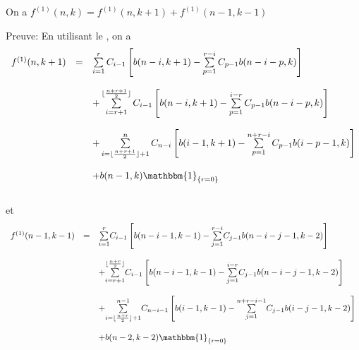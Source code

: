 \begin{proposition}\label{p11}
	On a $f^{(1)}(n, k) = f^{(1)}(n, k+1) + f^{(1)}(n-1, k-1)$
\end{proposition}
Preuve: En utilisant le , on a
$$
	\begin{array}{l l l}
		f^{(1)}(n, k+1) & =        & \sum\limits_{i=1}^{r}C_{i-1}\left[ b(n-i, k+1) - \sum\limits_{p=1}^{r-i}C_{p-1}b(n-i-p, k) \right]                                      \\ &\text{ }&\\
		                & \text{ } & + \sum\limits_{i=r+1}^{\lfloor \frac{n+r+1}{2} \rfloor}C_{i-1}\left[ b(n-i, k+1) - \sum\limits_{p=1}^{i-r}C_{p-1}b(n-i-p, k) \right]    \\ &\text{ }&\\
		                & \text{ } & + \sum\limits_{i=\lfloor \frac{n+r+1}{2} \rfloor +1}^{n}C_{n-i}\left[ b(i-1, k+1) - \sum\limits_{p=1}^{n+r-i}C_{p-1}b(i-p-1, k) \right] \\ &\text{ }&\\
		                & \text{ } & +  b(n-1, k)\mathbbm{1}_{\{r=0\}}                                                                                                       \\
	\end{array}
$$
\vspace{5pt}\\
et
\vspace{5pt}\\
$$
	\begin{array} {l l l}
		f^{(1)}(n-1,k-1) & =       & \underset{i=1}{\overset{r}{\sum}}C_{i-1}\left[b(n-i-1,k-1)-\underset{j=1}{\overset{r-i}{\sum}}C_{j-1}b(n-i-j-1,k-2)\right]                                   \\ &\text{ }&\\ &\text{}&+\underset{i=r+1}{\overset{\lfloor \frac{n+r}{2}\rfloor}{\sum}}C_{i-1}\left[b(n-i-1,k-1)-\underset{j=1}{\overset{i-r}{\sum}}C_{j-1}b(n-i-j-1,k-2)\right]\\ &\text{ }&\\
		                 & \text{} & +\underset{i=\lfloor \frac{n+r}{2}\rfloor+1}{\overset{n-1}{\sum}}C_{n-i-1}\left[b(i-1,k-1)-\underset{j=1}{\overset{n+r-i-1}{\sum}}C_{j-1}b(i-j-1,k-2)\right] \\ &\text{ }&\\
		                 & \text{} & +b(n-2,k-2)\mathbbm{1}_{\{r = 0\}}
	\end{array}
$$
\vspace{10pt}\\
